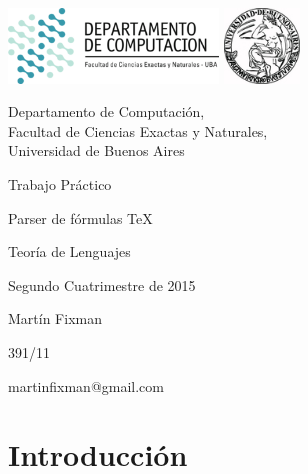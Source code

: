 \documentclass[a4paper, 10pt, twoside]{article}
\newcommand{\titulo}{Trabajo Pr\'actico}
\newcommand{\nombre}{Parser de f\'ormulas TeX}
\newcommand{\materia}{Teor\'ia de Lenguajes}
\newcommand{\cuatrimestre}{Segundo Cuatrimestre de 2015}
\begin{document}
\thispagestyle{caratula}

\begin{center}

\includegraphics[height=2cm]{DC.png}
\hfill
\includegraphics[height=2cm]{UBA.jpg}

\vspace{2cm}

Departamento de Computación,\\
Facultad de Ciencias Exactas y Naturales,\\
Universidad de Buenos Aires

\vspace{4cm}

\begin{Huge}
\titulo
\end{Huge}

\vspace{.5cm}

\begin{Huge}
\nombre
\end{Huge}

\vspace{0.5cm}

\begin{Large}
\materia
\end{Large}

\vspace{1cm}

\cuatrimestre

\vspace{4cm}

Mart\'in Fixman

391/11

martinfixman@gmail.com

\end{center}

\newpage

\tableofcontents

\newpage

\section{Introducci\'on}
\end{document}

